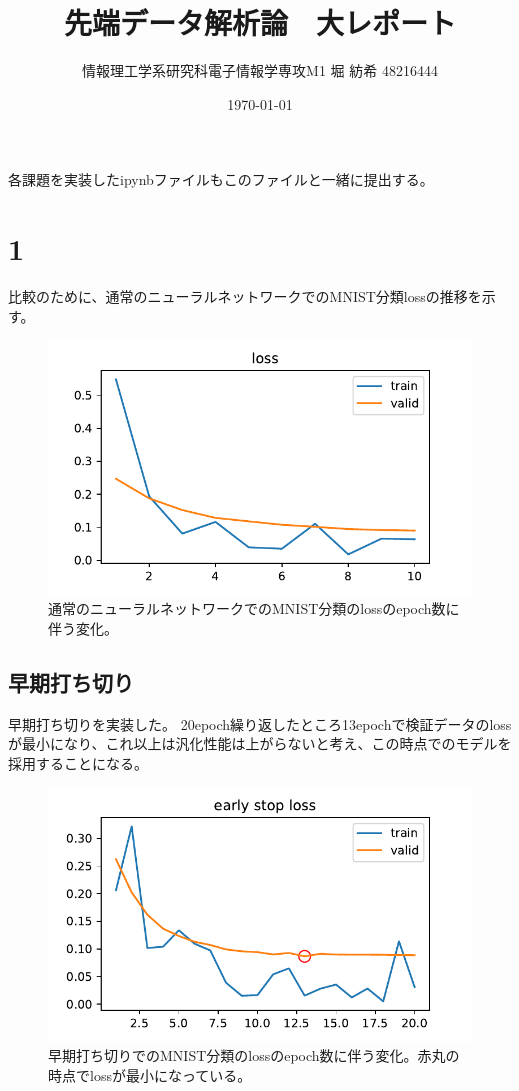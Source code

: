 \documentclass[a4paper,11pt]{jsarticle}
\begin{document}
  \title{先端データ解析論　大レポート}
  \author{情報理工学系研究科電子情報学専攻M1 堀 紡希 48216444}
  \date{\today}
  \maketitle
  各課題を実装したipynbファイルもこのファイルと一緒に提出する。
  \section*{1}
  比較のために、通常のニューラルネットワークでのMNIST分類lossの推移を示す。
  \begin{figure}[H]
    \centering
    \includegraphics[width=0.6\linewidth]{ortho.pdf}
    \caption{通常のニューラルネットワークでのMNIST分類のlossのepoch数に伴う変化。}
  \end{figure}

  \subsection*{早期打ち切り}
  早期打ち切りを実装した。
  20epoch繰り返したところ13epochで検証データのlossが最小になり、これ以上は汎化性能は上がらないと考え、この時点でのモデルを採用することになる。
  \begin{figure}[H]
    \centering
    \includegraphics[width=0.6\linewidth]{earlystop.pdf}
    \caption{早期打ち切りでのMNIST分類のlossのepoch数に伴う変化。赤丸の時点でlossが最小になっている。}
  \end{figure}
\end{document}
